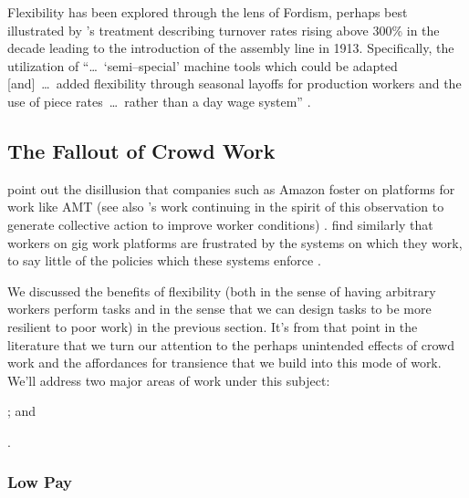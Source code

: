 \documentclass[trackingWork]{subfiles}
\begin{document}
{Flexibility has been explored through the lens of Fordism, perhaps best illustrated by
\citeauthor{tolliday1986between}'s treatment describing
turnover rates rising above 300\% in the decade leading to the introduction of the assembly line in 1913.
Specifically, the utilization of ``\dots~`semi--special' machine tools which could be adapted
[and]~\dots~added flexibility through seasonal layoffs for production workers and the use of
piece rates~\dots~rather than a day wage system''
\cite{tolliday1986between}.







\subsection{The Fallout of Crowd Work}\label{sec:Fallout}
\citeauthor{turkopticon} point out the disillusion that companies such as Amazon foster on platforms for work like AMT
(see also \citeauthor{dynamo}'s work
continuing in the spirit of this observation to generate collective action to improve worker conditions)
\cite{turkopticon,dynamo}.
\citeauthor{uberAlgorithm}
find similarly that workers on gig work platforms are frustrated by the systems on which they work,
to say little of the policies which these systems enforce
\cite{uberAlgorithm}.

We discussed the benefits of flexibility
(both in the sense of having arbitrary workers perform tasks and
in the sense that we can design tasks to be more resilient to poor work)
in the previous section.
It's from that point in the literature that we turn our attention to
the perhaps unintended effects of crowd work
and the affordances for transience that we build into this mode of work.
We'll address two major areas of work under this subject:
\begin{inlinelist}
\item {}; and
\item {}.
\end{inlinelist}

\subsubsection{Low Pay}\label{sec:lowPay}


}
\end{document}
